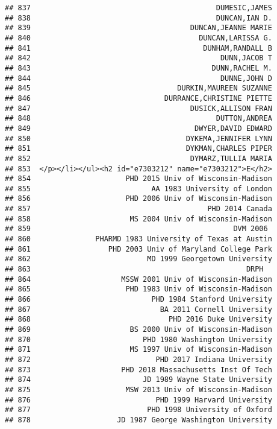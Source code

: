 \documentclass[
]{article}
\begin{document}
\begin{verbatim}
## 837                                           DUMESIC,JAMES
## 838                                           DUNCAN,IAN D.
## 839                                     DUNCAN,JEANNE MARIE
## 840                                       DUNCAN,LARISSA G.
## 841                                        DUNHAM,RANDALL B
## 842                                            DUNN,JACOB T
## 843                                          DUNN,RACHEL M.
## 844                                            DUNNE,JOHN D
## 845                                  DURKIN,MAUREEN SUZANNE
## 846                               DURRANCE,CHRISTINE PIETTE
## 847                                     DUSICK,ALLISON FRAN
## 848                                           DUTTON,ANDREA
## 849                                      DWYER,DAVID EDWARD
## 850                                    DYKEMA,JENNIFER LYNN
## 851                                    DYKMAN,CHARLES PIPER
## 852                                     DYMARZ,TULLIA MARIA
## 853  </p></li></ul><h2 id="e7303212" name="e7303212">E</h2>
## 854                      PHD 2015 Univ of Wisconsin-Madison
## 855                            AA 1983 University of London
## 856                      PHD 2006 Univ of Wisconsin-Madison
## 857                                         PHD 2014 Canada
## 858                       MS 2004 Univ of Wisconsin-Madison
## 859                                               DVM 2006 
## 860               PHARMD 1983 University of Texas at Austin
## 861                  PHD 2003 Univ of Maryland College Park
## 862                           MD 1999 Georgetown University
## 863                                                  DRPH  
## 864                     MSSW 2001 Univ of Wisconsin-Madison
## 865                      PHD 1983 Univ of Wisconsin-Madison
## 866                            PHD 1984 Stanford University
## 867                              BA 2011 Cornell University
## 868                                PHD 2016 Duke University
## 869                       BS 2000 Univ of Wisconsin-Madison
## 870                          PHD 1980 Washington University
## 871                       MS 1997 Univ of Wisconsin-Madison
## 872                             PHD 2017 Indiana University
## 873                     PHD 2018 Massachusetts Inst Of Tech
## 874                          JD 1989 Wayne State University
## 875                      MSW 2013 Univ of Wisconsin-Madison
## 876                             PHD 1999 Harvard University
## 877                           PHD 1998 University of Oxford
## 878                    JD 1987 George Washington University

\end{verbatim}
\end{document}

